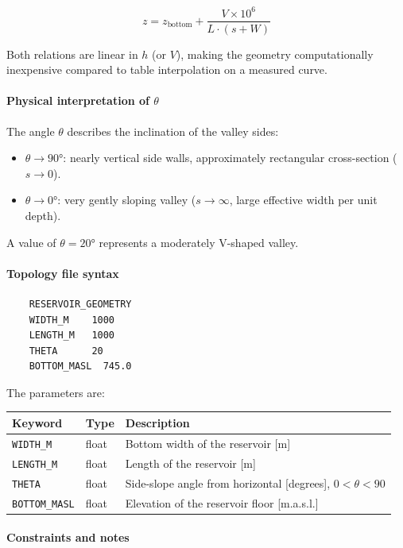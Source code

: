 \documentclass[a4paper, 12pt]{report}
\begin{document}
	\begin{equation}
		z = z_\text{bottom} + \frac{V \times 10^6}{L \cdot (s + W)}
	\end{equation}

	Both relations are linear in $h$ (or $V$), making the geometry computationally inexpensive compared to table interpolation on a measured curve.

	\paragraph{Physical interpretation of $\theta$}

	The angle $\theta$ describes the inclination of the valley sides:
	\begin{itemize}
		\item $\theta \to 90°$: nearly vertical side walls, approximately rectangular cross-section ($s \to 0$).
		\item $\theta \to 0°$: very gently sloping valley ($s \to \infty$, large effective width per unit depth).
	\end{itemize}
	A value of $\theta = 20°$ represents a moderately V-shaped valley.

	\paragraph{Topology file syntax}

\begin{verbatim}
	RESERVOIR_GEOMETRY
	WIDTH_M    1000
	LENGTH_M   1000
	THETA      20
	BOTTOM_MASL  745.0
\end{verbatim}

\noindent The parameters are:
\begin{center}
	\begin{tabular}{lll}
		\hline
		Keyword & Type & Description \\
		\hline
		\texttt{WIDTH\_M}     & float & Bottom width of the reservoir [m] \\
		\texttt{LENGTH\_M}    & float & Length of the reservoir [m] \\
		\texttt{THETA}        & float & Side-slope angle from horizontal [degrees], $0 < \theta < 90$ \\
		\texttt{BOTTOM\_MASL} & float & Elevation of the reservoir floor [m.a.s.l.] \\
		\hline
	\end{tabular}
\end{center}

\paragraph{Constraints and notes}
\end{document}
